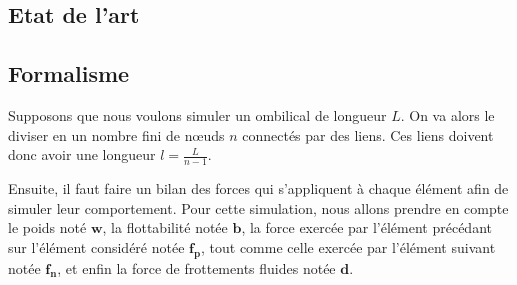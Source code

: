 \subsection{Etat de l'art}

\subsection{Formalisme}
    Supposons que nous voulons simuler un ombilical de longueur $L$. On va alors le diviser en un nombre fini de n\oe uds $n$ connectés par des liens. Ces liens doivent donc avoir une longueur $l=\frac{L}{n-1}$.

    Ensuite, il faut faire un bilan des forces qui s'appliquent à chaque élément afin de simuler leur comportement. Pour cette simulation, nous allons prendre en compte le poids noté $\mathbf{w}$, la flottabilité notée $\mathbf{b}$, la force exercée par l'élément précédant sur l'élément considéré notée $\mathbf{f_p}$, tout comme celle exercée par l'élément suivant notée $\mathbf{f_n}$, et enfin la force de frottements fluides notée $\mathbf{d}$.

